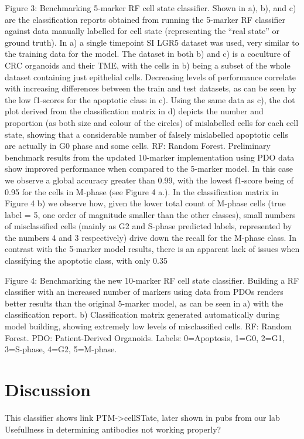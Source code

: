 Figure 3: Benchmarking 5-marker RF cell state classifier. Shown in a), b), and c) are the classification reports obtained from running the 5-marker RF classifier against data manually labelled for cell state (representing the “real state” or ground truth). In a) a single timepoint SI LGR5 dataset was used, very similar to the training data for the model. The dataset in both b) and c) is a coculture of CRC organoids and their TME, with the cells in b) being a subset of the whole dataset containing just epithelial cells. Decreasing levels of performance correlate with increasing differences between the train and test datasets, as can be seen by the low f1-scores for the apoptotic class in c). Using the same data as c), the dot plot derived from the classification matrix in d) depicts the number and proportion (as both size and colour of the circles) of mislabelled cells for each cell state, showing that a considerable number of falsely mislabelled apoptotic cells are actually in G0 phase and some cells. RF: Random Forest.
Preliminary benchmark results from the updated 10-marker implementation using PDO data show improved performance when compared to the 5-marker model. In this case we observe a global accuracy greater than 0.99, with the lowest f1-score being of 0.95 for the cells in M-phase (see Figure 4 a.). In the classification matrix in Figure 4 b) we observe how, given the lower total count of M-phase cells (true label = 5, one order of magnitude smaller than the other classes), small numbers of misclassified cells (mainly as G2 and S-phase predicted labels, represented by the numbers 4 and 3 respectively) drive down the recall for the M-phase class. 
In contrast with the 5-marker model results, there is an apparent lack of issues when classifying the apoptotic class, with only 0.35%
 
Figure 4: Benchmarking the new 10-marker RF cell state classifier. Building a RF classifier with an increased number of markers using data from PDOs renders better results than the original 5-marker model, as can be seen in a) with the classification report. b) Classification matrix generated automatically during model building, showing extremely low levels of misclassified cells. RF: Random Forest. PDO: Patient-Derived Organoids. Labels: 0=Apoptosis, 1=G0, 2=G1, 3=S-phase, 4=G2, 5=M-phase.


\section*{Discussion}
This classifier shows link PTM->cellSTate, later shown in pubs from our lab
Usefullness in determining antibodies not working properly?


